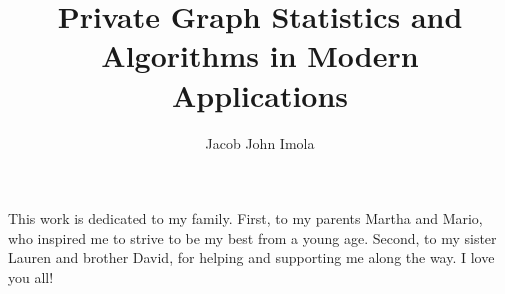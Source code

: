 \documentclass[12pt]{ucsddissertation}
\title{Private Graph Statistics and Algorithms in Modern Applications}
\author{Jacob John Imola}
\begin{document}
\frontmatter
\maketitle
\makecopyright
\makesignature
\begin{dedication}
\setsinglespacing
\raggedright %
\parindent0pt\parskip\baselineskip
This work is dedicated to my family. First, to my parents Martha and Mario,
who inspired me to strive to be my best from a young age. Second, to my
sister Lauren and brother David, for helping and supporting me along the way. 
I love you all!
\end{dedication}
\tableofcontents
\listoffigures
\listoftables
\end{document}
